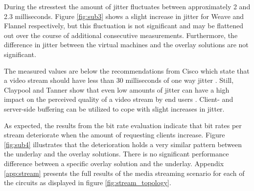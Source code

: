 During the stresstest the amount of jitter fluctuates between approximately 2 and 2.3 milliseconds. Figure \ref{fig:sub3} shows a slight increase in jitter for Weave and Flannel respectively, but this fluctuation is not significant and may be flattened out over the course of additional consecutive measurements. Furthermore, the difference in jitter between the virtual machines and the overlay solutions are not significant.

The measured values are below the recommendations from Cisco which state that a video stream should have less than 30 milliseconds of one way jitter \cite{szigeti_hattingh_2004}. Still, Claypool and Tanner show that even low amounts of jitter can have a high impact on the perceived quality of a video stream by end users \cite{claypool1999effects}. Client- and server-side buffering can be utilized to cope with slight increases in jitter.

As expected, the results from the bit rate evaluation indicate that bit rates per stream deteriorate when the amount of requesting clients increase. Figure \ref{fig:sub4} illustrates that the deterioration holds a very similar pattern between the underlay and the overlay solutions. There is no significant performance difference between a specific overlay solution and the underlay. Appendix \ref{app:stream} presents the full results of the media streaming scenario for each of the circuits as displayed in figure \ref{fig:stream_topology}.

